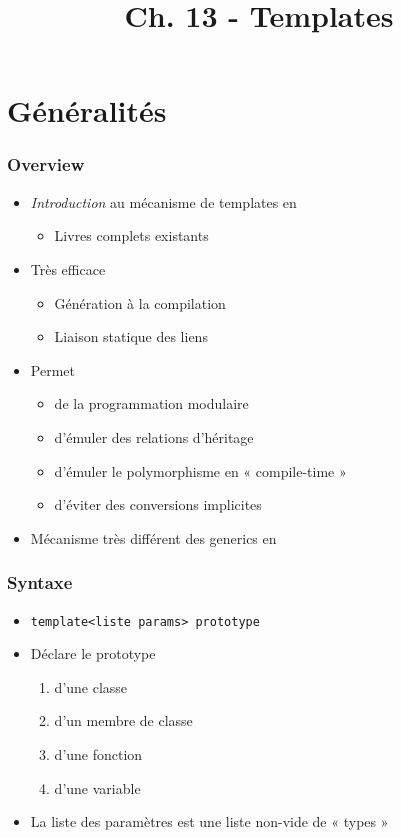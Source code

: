 


\title{Ch. 13 - Templates}




\section{Généralités}

\begin{frame}
\frametitle{Overview}
\begin{itemize}[<+->]
\item \emph{Introduction} au mécanisme de templates en \cpp
	\begin{itemize}
	\item Livres complets existants
	\end{itemize}
\item Très efficace
	\begin{itemize}
	\item Génération à la compilation
	\item Liaison statique des liens
	\end{itemize}
\item Permet
	\begin{itemize}
	\item de la programmation modulaire
	\item d'émuler des relations d'héritage
	\item d'émuler le polymorphisme en « compile-time »
	\item d'éviter des conversions implicites
	\end{itemize}
\item Mécanisme très différent des generics en \java
\end{itemize}
\end{frame}

\begin{frame}
\frametitle{Syntaxe}
\begin{itemize}[<+->]
\item \lstinline|template<liste params> prototype|
\item Déclare le prototype
	\begin{enumerate}
	\item d'une classe
	\item d'un membre de classe
	\item d'une fonction
	\item d'une variable
	\end{enumerate}
\item La liste des paramètres est une liste non-vide de « types » 
\end{itemize}
\end{frame}

